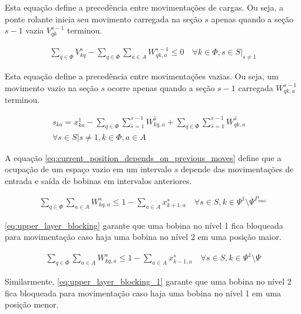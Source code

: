 \documentclass[journal]{IEEEtran}
\begin{document}
        Esta equação define a precedência entre movimentações de cargas. Ou seja,
        a ponte rolante inicia seu movimento carregada na seção $s$ apenas quando
        a seção $s-1$ vazia $V^{s-1}_{qk}$ terminou.

        \begin{align}
            \sum_{q \in \Phi} V^s_{kq} - \sum_{q \in \Phi} \sum_{a \in A} W^{s-1}_{qk,a} \leq 0 \quad \forall k \in \Phi, s \in S |_{s \neq 1}
            \label{eq:movement_precence_empty_after_ld}
        \end{align}

        Esta equação define a precedência entre movimentações vazias. Ou seja,
        um movimento vazio na seção $s$ ocorre apenas quando
        a seção $s-1$ carregada $W^{s-1}_{qk,a}$ terminou.

        \begin{align}
            s_{ka} = x^1_{ka} - \sum_{q \in \Phi} \sum_{\hat{s}=1}^{s-1} W^{\hat{s}}_{kq,a} + \sum_{q \in \Phi} \sum_{\hat{s}=1}^{s-1} W^{\hat{s}}_{qk,a} \quad \\
            \forall s \in S | s \neq 1, k \in \Phi, a \in A
            \label{eq:current_position_depends_on_previous_moves}
        \end{align}

        A equação \ref{eq:current_position_depends_on_previous_moves} define
        que a ocupação de um espaço vazio em um intervalo $s$ depende das movimentações
        de entrada e saída de bobinas em intervalos anteriores.


        \begin{align}
            \sum_{q \in \Phi} \sum_{a \in A} W^s_{kq,a} \leq 1 - \sum_{a \in A} x^s_{k+1,a} \quad \forall s \in S, k \in \Psi^1 \setminus \Psi^{P_{max}}
            \label{eq:upper_layer_blocking}
        \end{align}

        \ref{eq:upper_layer_blocking} garante que uma bobina no nível 1 fica 
        bloqueada para movimentação caso haja uma bobina no nível 2 em uma posição
        maior.

        \begin{align}
            \sum_{q \in \Phi} \sum_{a \in A} W^s_{kq,a} \leq 1 - \sum_{a \in A} x^s_{k-1,a} \quad \forall s \in S, k \in \Psi^1 \setminus \Psi
            \label{eq:upper_layer_blocking_1}
        \end{align}

        Similarmente, \ref{eq:upper_layer_blocking_1} garante que uma bobina no nível 2 fica 
        bloqueada para movimentação caso haja uma bobina no nível 1 em uma posição
        menor.
\end{document}
